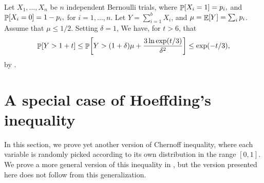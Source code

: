 \begin{example}
    Let $X_1, \ldots, X_n$ be $n$ independent Bernoulli trials, where
    \begin{math}
        \Prob{ X_i = 1 } =p_i,
    \end{math}
    and
    \begin{math}
        \Prob{ X_i = 0 } =1- p_i,
    \end{math}
    for $i=1,\ldots, n$.  Let $Y = \sum_{i=1}^{b} X_i$, and
    $\mu = \mathop{\mathbb{E}}\!\left[ { Y} \right] = \sum_i p_i$. Assume that $\mu \leq 1/2$. Setting
    $\delta=1$, We have, for $t >6$, that
    \begin{equation*}
        \Prob{Y > 1 + t} %
        \leq
        \Prob{Y > (1+\delta)\mu + \frac{3 \ln \exp( t/3 )}{\delta^2}} %
        \leq%
        \exp( -t /3 ),
    \end{equation*}
    by .
\end{example}




   \section{A special case of Hoeffding's inequality}

   In this section, we prove yet another version of Chernoff
   inequality, where each variable is randomly picked according to its
   own distribution in the range $[0,1]$. We prove a more general
   version of this inequality in , but the version
   presented here does not follow from this generalization.


